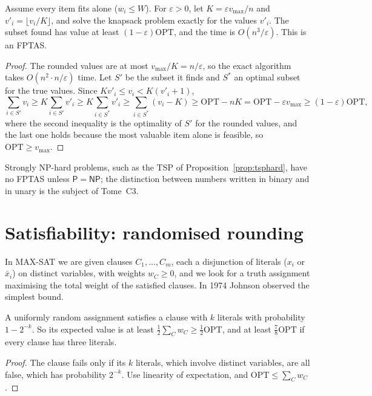 \begin{theorem}\label{thm:fptas}
Assume every item fits alone ($w_i\le W$). For $\varepsilon>0$, let $K=\varepsilon v_{\max}/n$ and $v'_i=\lfloor v_i/K\rfloor$, and solve the knapsack problem exactly for the values $v'_i$. The subset found has value at least $(1-\varepsilon)\mathrm{OPT}$, and the time is $O(n^3/\varepsilon)$. This is an FPTAS.
\end{theorem}
\begin{proof}
The rounded values are at most $v_{\max}/K=n/\varepsilon$, so the exact algorithm takes $O(n^2\cdot n/\varepsilon)$ time. Let $S'$ be the subset it finds and $S^*$ an optimal subset for the true values. Since $Kv'_i\le v_i<K(v'_i+1)$,
\[
\sum_{i\in S'}v_i\ge K\sum_{i\in S'}v'_i\ge K\sum_{i\in S^*}v'_i\ge\sum_{i\in S^*}(v_i-K)\ge\mathrm{OPT}-nK=\mathrm{OPT}-\varepsilon v_{\max}\ge(1-\varepsilon)\mathrm{OPT},
\]
where the second inequality is the optimality of $S'$ for the rounded values, and the last one holds because the most valuable item alone is feasible, so $\mathrm{OPT}\ge v_{\max}$.
\end{proof}

Strongly NP-hard problems, such as the TSP of Proposition~\ref{prop:tsphard}, have no FPTAS unless $\mathsf P=\mathsf{NP}$; the distinction between numbers written in binary and in unary is the subject of Tome~C3.

\section{Satisfiability: randomised rounding}\label{sec:maxsat}

In MAX-SAT we are given clauses $C_1,\dots,C_m$, each a disjunction of literals ($x_i$ or $\bar x_i$) on distinct variables, with weights $w_C\ge0$, and we look for a truth assignment maximising the total weight of the satisfied clauses. In 1974 Johnson observed the simplest bound.

\begin{proposition}\label{prop:maxsatrandom}
A uniformly random assignment satisfies a clause with $k$ literals with probability $1-2^{-k}$. So its expected value is at least $\frac12\sum_Cw_C\ge\frac12\mathrm{OPT}$, and at least $\frac78\mathrm{OPT}$ if every clause has three literals.
\end{proposition}
\begin{proof}
The clause fails only if its $k$ literals, which involve distinct variables, are all false, which has probability $2^{-k}$. Use linearity of expectation, and $\mathrm{OPT}\le\sum_Cw_C$.
\end{proof}


